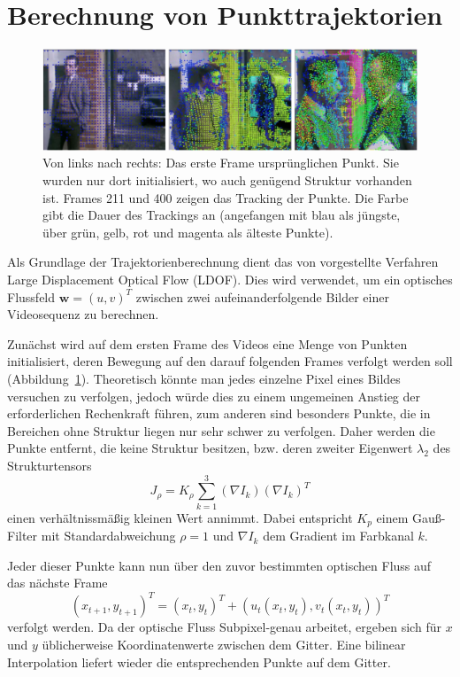 \section{Berechnung von Punkttrajektorien}

\begin{figure}[bt]\centering\includegraphics[width=7.0in]{images/trajectories.png}
  \caption{Von links nach rechts: Das erste Frame ursprünglichen Punkt. Sie wurden nur dort initialisiert, wo auch genügend Struktur vorhanden ist.
    Frames 211 und 400 zeigen das Tracking der Punkte. Die Farbe gibt die Dauer des Trackings an (angefangen mit blau als jüngste, über grün, gelb, rot
    und magenta als älteste Punkte).}
  \label{fig:trajectories}
\end{figure}

Als Grundlage der Trajektorienberechnung dient das von \cite{a001} vorgestellte Verfahren Large Displacement Optical Flow (LDOF).
Dies wird verwendet, um ein optisches Flussfeld $\textbf{w} = (u,v)^T$ zwischen zwei aufeinanderfolgende Bilder einer Videosequenz zu berechnen.

Zunächst wird auf dem ersten Frame des Videos eine Menge von Punkten initialisiert, deren Bewegung auf den darauf folgenden Frames verfolgt werden soll (Abbildung~\ref{fig:trajectories}).
Theoretisch könnte man jedes einzelne Pixel eines Bildes versuchen zu verfolgen, jedoch würde dies zu einem ungemeinen Anstieg der erforderlichen
Rechenkraft führen, zum anderen sind besonders Punkte, die in Bereichen ohne Struktur liegen nur sehr schwer zu verfolgen. Daher werden die Punkte entfernt,
die keine Struktur besitzen, bzw. deren zweiter Eigenwert $\lambda_2$ des Strukturtensors
\begin{equation}
  J_\rho = K_\rho \sum \limits_{k=1}^3 (\nabla I_k)(\nabla I_k)^T
\end{equation}
einen verhältnissmäßig kleinen Wert annimmt. Dabei entspricht $K_p$ einem Gauß-Filter mit Standardabweichung $\rho = 1$ und
$\nabla I_k$ dem Gradient im Farbkanal $k$.

Jeder dieser Punkte kann nun über den zuvor bestimmten optischen Fluss auf das nächste Frame
\begin{equation}
  (x_{t+1}, y_{t+1})^T = (x_t,y_t)^T + (u_t(x_t,y_t), v_t(x_t,y_t))^T
\end{equation}
verfolgt werden. Da der optische Fluss Subpixel-genau arbeitet, ergeben sich für $x$ und $y$ üblicherweise Koordinatenwerte zwischen dem Gitter.
Eine bilinear Interpolation liefert wieder die entsprechenden Punkte auf dem Gitter.

